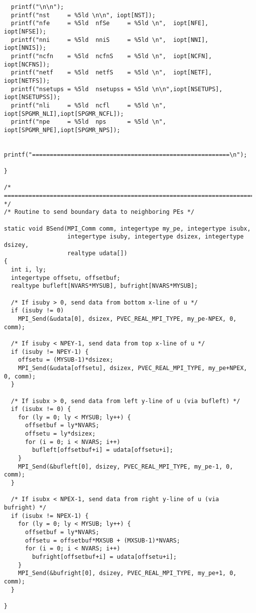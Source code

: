 \begin{verbatim}
  printf("\n\n");
  printf("nst     = %5ld \n\n", iopt[NST]);
  printf("nfe     = %5ld  nfSe     = %5ld \n",  iopt[NFE],      iopt[NFSE]);
  printf("nni     = %5ld  nniS     = %5ld \n",  iopt[NNI],      iopt[NNIS]);
  printf("ncfn    = %5ld  ncfnS    = %5ld \n",  iopt[NCFN],     iopt[NCFNS]);
  printf("netf    = %5ld  netfS    = %5ld \n",  iopt[NETF],     iopt[NETFS]);
  printf("nsetups = %5ld  nsetupss = %5ld \n\n",iopt[NSETUPS],  iopt[NSETUPSS]);
  printf("nli     = %5ld  ncfl     = %5ld \n",  iopt[SPGMR_NLI],iopt[SPGMR_NCFL]);
  printf("npe     = %5ld  nps      = %5ld \n",  iopt[SPGMR_NPE],iopt[SPGMR_NPS]);

  printf("========================================================\n");

}

/* ======================================================================= */
/* Routine to send boundary data to neighboring PEs */

static void BSend(MPI_Comm comm, integertype my_pe, integertype isubx, 
                  integertype isuby, integertype dsizex, integertype dsizey, 
                  realtype udata[])
{
  int i, ly;
  integertype offsetu, offsetbuf;
  realtype bufleft[NVARS*MYSUB], bufright[NVARS*MYSUB];

  /* If isuby > 0, send data from bottom x-line of u */
  if (isuby != 0)
    MPI_Send(&udata[0], dsizex, PVEC_REAL_MPI_TYPE, my_pe-NPEX, 0, comm);

  /* If isuby < NPEY-1, send data from top x-line of u */
  if (isuby != NPEY-1) {
    offsetu = (MYSUB-1)*dsizex;
    MPI_Send(&udata[offsetu], dsizex, PVEC_REAL_MPI_TYPE, my_pe+NPEX, 0, comm);
  }

  /* If isubx > 0, send data from left y-line of u (via bufleft) */
  if (isubx != 0) {
    for (ly = 0; ly < MYSUB; ly++) {
      offsetbuf = ly*NVARS;
      offsetu = ly*dsizex;
      for (i = 0; i < NVARS; i++)
        bufleft[offsetbuf+i] = udata[offsetu+i];
    }
    MPI_Send(&bufleft[0], dsizey, PVEC_REAL_MPI_TYPE, my_pe-1, 0, comm);   
  }

  /* If isubx < NPEX-1, send data from right y-line of u (via bufright) */
  if (isubx != NPEX-1) {
    for (ly = 0; ly < MYSUB; ly++) {
      offsetbuf = ly*NVARS;
      offsetu = offsetbuf*MXSUB + (MXSUB-1)*NVARS;
      for (i = 0; i < NVARS; i++)
        bufright[offsetbuf+i] = udata[offsetu+i];
    }
    MPI_Send(&bufright[0], dsizey, PVEC_REAL_MPI_TYPE, my_pe+1, 0, comm);   
  }

}
 

\end{verbatim}
